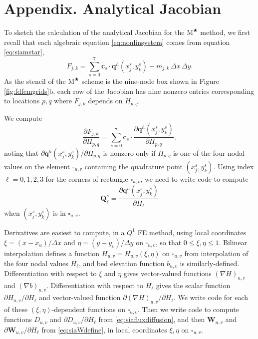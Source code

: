 \documentclass[twocolumn,letterpaper]{igs}
\newcommand\bc{\mathbf{c}}
\newcommand\bq{\mathbf{q}}
\newcommand\bQ{\mathbf{Q}}
\newcommand\bW{\mathbf{W}}
\newcommand{\grad}{\nabla}
\newcommand{\Mstar}{$\text{M}^{\bigstar}$\xspace}
\begin{document}
\appendix
\section{Appendix. Analytical Jacobian}  \label{sec:app}

To sketch the calculation of the analytical Jacobian for the \Mstar method, we first recall that each algebraic equation \eqref{eq:nonlinsystem} comes from equation \eqref{eq:siamstar},
\begin{equation}
  F_{j,k} = \sum_{s=0}^7 \bc_s\cdot \bq^h(x_j^s,y_k^s) - m_{j,k}\,\Delta x\,\Delta y.  \label{eq:res}
\end{equation}
As the stencil of the \Mstar scheme is the nine-node box shown in Figure \ref{fig:fdfemgrids}b, each row of the Jacobian has nine nonzero entries corresponding to locations $p,q$ where $F_{j,k}$ depends on $H_{p,q}$.

We compute
\begin{equation}
\frac{\partial F_{j,k}}{\partial H_{p,q}} = \sum_{s=0}^7 \bc_s\cdot \frac{\partial \bq^h(x_j^s,y_k^s)}{\partial H_{p,q}}, \label{eq:jacQsum}
\end{equation}
noting that $\partial \bq^h(x_j^s,y_k^s)/\partial H_{p,q}$ is nonzero only if $H_{p,q}$ is one of the four nodal values on the element $\square_{u,v}$ containing the quadrature point $(x_j^s,y_k^s)$.  Using index $\ell=0,1,2,3$ for the corners of rectangle $\square_{u,v}$, we need to write code to compute
\begin{equation}
\bQ_\ell^s = \frac{\partial \bq^h(x_j^s,y_k^s)}{\partial H_\ell} \label{eq:jacthegoal}
\end{equation}
when $(x_j^s,y_k^s)$ is in $\square_{u,v}$.

\newcommand{\uppoint}{(\xi_{\text{up}}^s,\eta_{\text{up}}^s)}
Derivatives are easiest to compute, in a $Q^1$ FE method, using local coordinates $\xi=(x-x_u)/\Delta x$ and $\eta=(y-y_v)/\Delta y$ on $\square_{u,v}$, so that $0\le \xi,\eta \le 1$.  Bilinear interpolation defines a function $H_{u,v}=H_{u,v}(\xi,\eta)$ on $\square_{u,v}$ from interpolation of the four nodal values $H_\ell$, and bed elevation function $b_{u,v}$ is similarly-defined.  Differentiation with respect to $\xi$ and $\eta$ gives vector-valued functions $(\grad H)_{u,v}$ and $(\grad b)_{u,v}$.  Differentiation with respect to $H_\ell$ gives the scalar function $\partial H_{u,v}/\partial H_\ell$ and vector-valued function $\partial (\grad H)_{u,v}/\partial H_\ell$.  We write code for each of these $(\xi,\eta)$-dependent functions on $\square_{u,v}$.  Then we write code to compute functions $D_{u,v}$ and $\partial D_{u,v}/\partial H_\ell$ from \eqref{eq:siafluxdiffusion}, and then $\bW_{u,v}$ and $\partial \bW_{u,v}/\partial H_\ell$ from \eqref{eq:siaWdefine}, in local coordinates $\xi,\eta$ on $\square_{u,v}$.
\end{document}
